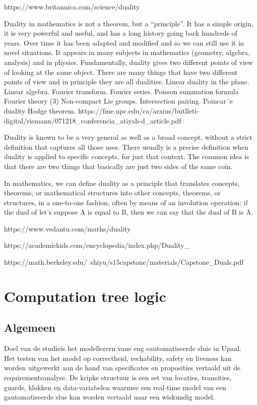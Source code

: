 \documentclass{article}
\begin{document}
	https://www.britannica.com/science/duality
	
	
	Duality in mathematics is not a theorem, but a “principle”. It has a
	simple origin, it is very powerful and useful, and has a long history going
	back hundreds of years. Over time it has been adapted and modified
	and so we can still use it in novel situations. It appears in many
	subjects in mathematics (geometry, algebra, analysis) and in physics.
	Fundamentally, duality gives two different points of view of looking at
	the same object. There are many things that have two different points
	of view and in principle they are all dualities.
	Linear duality in the plane. 
	Linear algebra.
	Fourier transform.
	Fourier series.
	Poisson summation formula
	Fourier theory
	(3) Non-compact Lie groups.
	Intersection pairing.
	Poincar´e duality
	Hodge theorem.
	https://fme.upc.edu/ca/arxius/butlleti-digital/riemann/071218_conferencia_atiyah-d_article.pdf
	
	
	Duality is known to be a very general as well as a broad concept, without a strict definition that captures all those uses. There usually is a precise definition when duality is applied to specific concepts, for just that context. The common idea is that there are two things that basically are just two sides of the same coin.
	
	In mathematics, we can define duality as a principle that translates concepts, theorems, or mathematical structures into other concepts, theorems, or structures, in a one-to-one fashion, often by means of an involution operation: if the dual of let’s suppose A is equal to B, then we can say that the dual of B is A.
	
	https://www.vedantu.com/maths/duality
	
	
	https://academickids.com/encyclopedia/index.php/Duality_%
	
	https://math.berkeley.edu/~shiyu/s15capstone/materials/Capstone_Duals.pdf
	\section{Computation tree logic}
	
	\subsection{Algemeen}
	Doel van de studieis het modellerern vane eng eautomatiseerde sluis in Upaal. Het testen van het model op correctheid, rechability, safety en liveness kan worden uitgewerkt aan de hand van specificates en proposities vertaald uit de requirementsanalyse. De kripke structuur is een set van locaties, transities, guards, klokken en data-variabelen waarmee een real-time model van een gautomatiseerde slus kan worden vertaald naar een wiskundig model.
	
\end{document}
